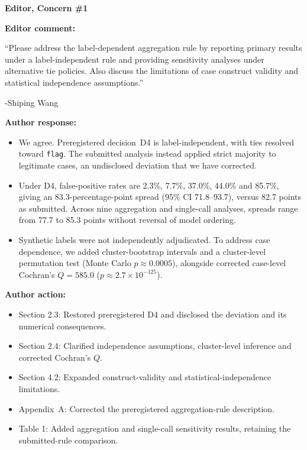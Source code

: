 \documentclass[11pt]{article}
\newcommand{\rvcomment}[1]{{\color{ReviewerGreen}#1}}
\newcommand{\concern}[1]{\textbf{\color{ReviewerGreen}#1}}
\begin{document}
\vspace{12pt}
\concern{Editor, Concern \#1}

\concern{Editor comment:}

\rvcomment{``Please address the label-dependent aggregation rule by reporting primary results under a label-independent rule and providing sensitivity analyses under alternative tie policies. Also discuss the limitations of case construct validity and statistical independence assumptions.''}

\rvcomment{-Shiping Wang}

\textbf{Author response:}

\begin{itemize}

\item We agree. Preregistered decision~D4 is label-independent, with ties resolved toward \texttt{flag}. The submitted analysis instead applied strict majority to legitimate cases, an undisclosed deviation that we have corrected.

\item Under D4, false-positive rates are 2.3\%, 7.7\%, 37.0\%, 44.0\% and 85.7\%, giving an 83.3-percentage-point spread (95\% CI 71.8--93.7), versus 82.7 points as submitted. Across nine aggregation and single-call analyses, spreads range from 77.7 to 85.3 points without reversal of model ordering.

\item Synthetic labels were not independently adjudicated. To address case dependence, we added cluster-bootstrap intervals and a cluster-level permutation test (Monte Carlo $p \approx 0.0005$), alongside corrected case-level Cochran's $Q = 585.0$ ($p \approx 2.7\times10^{-125}$).

\end{itemize}

\textbf{Author action:}

\begin{itemize}

\item Section 2.3: Restored preregistered D4 and disclosed the deviation and its numerical consequences.

\item Section 2.4: Clarified independence assumptions, cluster-level inference and corrected Cochran's $Q$.

\item Section 4.2: Expanded construct-validity and statistical-independence limitations.

\item Appendix~A: Corrected the preregistered aggregation-rule description.

\item Table 1: Added aggregation and single-call sensitivity results, retaining the submitted-rule comparison.

\end{itemize}
\end{document}
